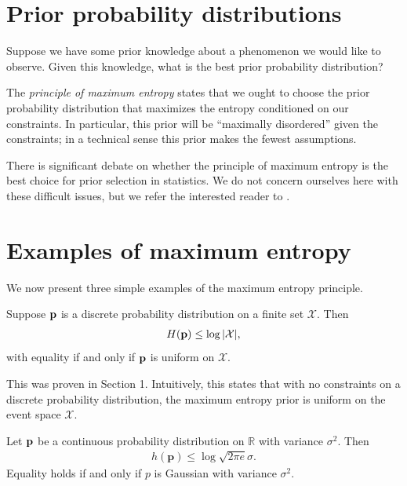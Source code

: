 \documentclass[13pt]{article}
\newcommand{\p}{\mathbf{p}}
\begin{document}
\section{Prior probability distributions}

Suppose we have some prior knowledge about a phenomenon we would like to observe.  Given this knowledge, what is the best prior probability distribution?

The {\it principle of maximum entropy} states that we ought to choose the prior probability distribution that maximizes the entropy conditioned on our constraints.  In particular, this prior will be ``maximally disordered'' given the constraints; in a technical sense this prior makes the fewest assumptions.

There is significant debate on whether the principle of maximum entropy is the best choice for prior selection in statistics.  We do not concern ourselves here with these difficult issues, but we refer the interested reader to \cite{cover2012elements}\cite{jaynes1982rationale}\cite{mackay2003information}.

\section{Examples of maximum entropy}

We now present three simple examples of the maximum entropy principle.

\begin{theorem}
  Suppose $\mathbf{p}$ is a discrete probability distribution on a finite set $\mathcal{X}$.  Then
  \begin{align*}
    H(\mathbf{p}) \leq \log |\mathcal{X}|,
  \end{align*}
  with equality if and only if $\mathbf{p}$ is uniform on $\mathcal{X}$.
\end{theorem}

This was proven in Section 1.  Intuitively, this states that with no constraints on a discrete probability distribution, the maximum entropy prior is uniform on the event space $\mathcal{X}$. \\

\begin{theorem}
  Let $\mathbf{p}$ be a continuous probability distribution on $\mathbb{R}$ with variance $\sigma^2$.  Then
  \begin{align*}
    h(\p) \leq \log \sqrt{2 \pi e} \sigma.
  \end{align*}
  Equality holds if and only if $p$ is Gaussian with variance $\sigma^2$. \\
\end{theorem}
\end{document}
